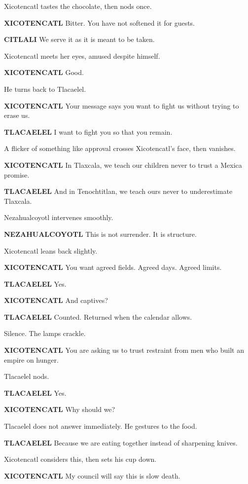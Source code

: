 \documentclass[12pt]{article}
\begin{document}
Xicotencatl tastes the chocolate, then nods once.

\textbf{XICOTENCATL}  
Bitter.  
You have not softened it for guests.

\textbf{CITLALI}  
We serve it as it is meant to be taken.

Xicotencatl meets her eyes, amused despite himself.

\textbf{XICOTENCATL}  
Good.

He turns back to Tlacaelel.

\textbf{XICOTENCATL}  
Your message says you want to fight us  
without trying to erase us.

\textbf{TLACAELEL}  
I want to fight you  
so that you remain.

A flicker of something like approval crosses Xicotencatl’s face, then vanishes.

\textbf{XICOTENCATL}  
In Tlaxcala, we teach our children  
never to trust a Mexica promise.

\textbf{TLACAELEL}  
And in Tenochtitlan, we teach ours  
never to underestimate Tlaxcala.

Nezahualcoyotl intervenes smoothly.

\textbf{NEZAHUALCOYOTL}  
This is not surrender.  
It is structure.

Xicotencatl leans back slightly.

\textbf{XICOTENCATL}  
You want agreed fields.  
Agreed days.  
Agreed limits.

\textbf{TLACAELEL}  
Yes.

\textbf{XICOTENCATL}  
And captives?

\textbf{TLACAELEL}  
Counted.  
Returned when the calendar allows.

Silence. The lamps crackle.

\textbf{XICOTENCATL}  
You are asking us to trust restraint  
from men who built an empire on hunger.

Tlacaelel nods.

\textbf{TLACAELEL}  
Yes.

\textbf{XICOTENCATL}  
Why should we?

Tlacaelel does not answer immediately. He gestures to the food.

\textbf{TLACAELEL}  
Because we are eating together  
instead of sharpening knives.

Xicotencatl considers this, then sets his cup down.

\textbf{XICOTENCATL}  
My council will say this is slow death.
\end{document}
